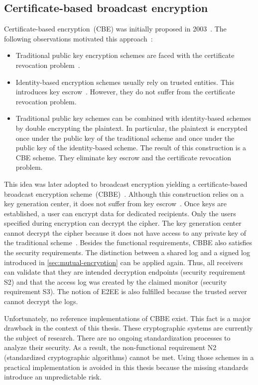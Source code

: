 \documentclass[../main.tex]{subfiles}
\begin{document}
\subsection{Certificate-based broadcast encryption}
\label{sec:broadcast-certificate}

Certificate-based encryption~(CBE) was initially proposed in 2003~\cite{Gentry2003}. 
The following observations motivated this approach~\cite{Hagg2022}:
\begin{itemize}
    \item 
    Traditional public key encryption schemes are faced with the certificate revocation problem~\cite{Gentry2003}.
    \item 
    Identity-based encryption schemes usually rely on trusted entities. 
    This introduces key escrow~\cite{Hagg2022}.
    However, they do not suffer from the certificate revocation problem.
    \item 
    Traditional public key schemes can be combined with identity-based schemes by double encrypting the plaintext.
    In particular, the plaintext is encrypted once under the public key of the traditional scheme and once under the public key of the identity-based scheme.
    The result of this construction is a CBE scheme.
    They eliminate key escrow and the certificate revocation problem.
\end{itemize}

This idea was later adopted to broadcast encryption yielding a certificate-based broadcast encryption scheme~(CBBE)~\cite{Li2018}.
Although this construction relies on a key generation center, it does not suffer from key escrow~\cite{Hagg2022}.
Once keys are established, a user can encrypt data for dedicated recipients.
Only the users specified during encryption can decrypt the cipher.
The key generation center cannot decrypt the cipher because it does not have access to any private key of the traditional scheme~\cite{Hagg2022}.
Besides the functional requirements, CBBE also satisfies the security requirements.
The distinction between a shared log and a signed log introduced in \cref{sec:mutual-encryption} can be applied again.
Thus, all receivers can validate that they are intended decryption endpoints (security requirement S2) and that the access log was created by the claimed monitor (security requirement S3).
The notion of E2EE is also fulfilled because the trusted server cannot decrypt the logs.

Unfortunately, no reference implementations of CBBE exist.
This fact is a major drawback in the context of this thesis.
These cryptographic systems are currently the subject of research.
There are no ongoing standardization processes to analyze their security.
As a result, the non-functional requirement N2 (standardized cryptographic algorithms) cannot be met.
Using those schemes in a practical implementation is avoided in this thesis because the missing standards introduce an unpredictable risk.
\end{document}
